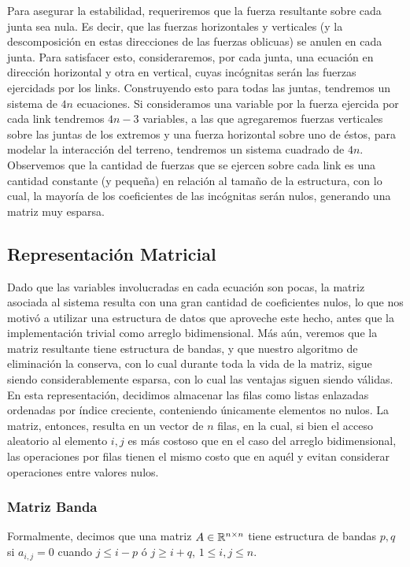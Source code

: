 Para asegurar la estabilidad, requeriremos que la fuerza resultante sobre cada junta sea nula. Es decir, que las fuerzas horizontales y verticales (y la descomposición en estas direcciones de las fuerzas oblicuas) se anulen en cada junta. Para satisfacer esto, consideraremos, por cada junta, una ecuación en dirección horizontal y otra en vertical, cuyas incógnitas serán las fuerzas ejercidads por los links. Construyendo esto para todas las juntas, tendremos un sistema de $4n$ ecuaciones. Si consideramos una variable por la fuerza ejercida por cada link tendremos $4n-3$ variables, a las que agregaremos fuerzas verticales sobre las juntas de los extremos y una fuerza horizontal sobre uno de éstos, para modelar la interacción del terreno, tendremos un sistema cuadrado de $4n$. Observemos que la cantidad de fuerzas que se ejercen sobre cada link es una cantidad constante (y pequeña) en relación al tamaño de la estructura, con lo cual, la mayoría de los coeficientes de las incógnitas serán nulos, generando una matriz muy esparsa.

\subsection{Representación Matricial}
Dado que las variables involucradas en cada ecuación son pocas, la matriz asociada al sistema resulta con una gran cantidad de coeficientes nulos, lo que nos motivó a utilizar una estructura de datos que aproveche este hecho, antes que la implementación trivial como arreglo bidimensional. Más aún, veremos que la matriz resultante tiene estructura de bandas, y que nuestro algoritmo de eliminación la conserva, con lo cual durante toda la vida de la matriz, sigue siendo considerablemente esparsa, con lo cual las ventajas siguen siendo válidas. En esta representación, decidimos almacenar las filas como listas enlazadas ordenadas por índice creciente, conteniendo únicamente elementos no nulos. La matriz, entonces, resulta en un vector de $n$ filas, en la cual, si bien el acceso aleatorio al elemento $i,j$ es más costoso que en el caso del arreglo bidimensional, las operaciones por filas tienen el mismo costo que en aquél y evitan considerar operaciones entre valores nulos.

\subsubsection{Matriz Banda}
Formalmente, decimos que una matriz $A \in \mathbb{R} ^{n\times n}$ tiene estructura de bandas $p,q$ si $a_{i,j} = 0$ cuando $j \leq i-p$ ó $j\geq i+q$, $1\leq i,j \leq n$.


